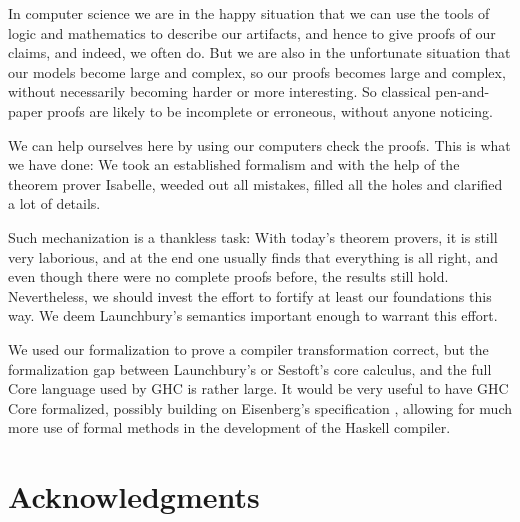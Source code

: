 \documentclass{jfp1}
\theoremstyle{nonumberbreak}
\begin{document}
In computer science we are in the happy situation that we can use the tools of logic and mathematics to describe our artifacts, and hence to give proofs of our claims, and indeed, we often do. But we are also in the unfortunate situation that our models become large and complex, so our proofs becomes large and complex, without necessarily becoming harder or more interesting. So classical pen-and-paper proofs are likely to be incomplete or erroneous, without anyone noticing.

We can help ourselves here by using our computers check the proofs. This is what we have done: We took an established formalism and with the help of the theorem prover Isabelle, weeded out all mistakes, filled all the holes and clarified a lot of details.

Such mechanization is a thankless task: With today's theorem provers, it is still very laborious, and at the end one usually finds that everything is all right, and even though there were no complete proofs before, the results still hold. Nevertheless, we should invest the effort to fortify at least our foundations this way. We deem Launchbury’s semantics important enough to warrant this effort.

\smallskip

We used our formalization to prove a compiler transformation correct, but the formalization gap between Launchbury’s or Sestoft’s core calculus, and the full Core language used by GHC is rather large. It would be very useful to have GHC Core formalized, possibly building on Eisenberg’s specification , allowing for much more use of formal methods in the development of the Haskell compiler.

\section*{Acknowledgments}




\end{document}
